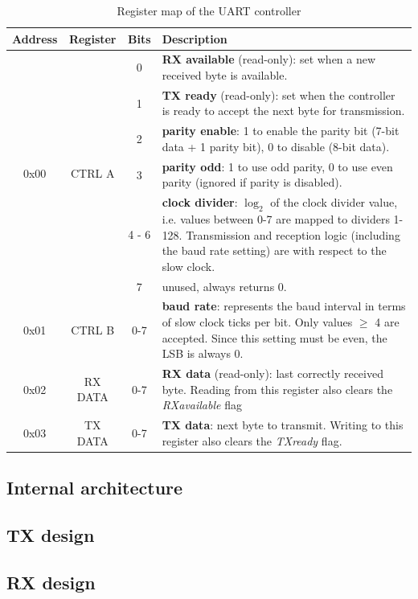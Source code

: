 \documentclass[12pt,a4paper]{article}
\begin{document}
\begin{table}[h]
	\centering
	\begin{tabularx}{\linewidth}{|c|c|c|X|}
		\hline
		Address & Register & Bits & Description \\
		\hline
		\hline
		\multirow{6}{*}{0x00} & \multirow{6}{*}{CTRL A} & 0 & \textbf{RX available} (read-only): set when a new received byte is available. \\
		 & & 1 & \textbf{TX ready} (read-only): set when the controller is ready to accept the next byte for transmission. \\
		 & & 2 & \textbf{parity enable}: 1 to enable the parity bit (7-bit data + 1 parity bit), 0 to disable (8-bit data). \\
		 & & 3 & \textbf{parity odd}: 1 to use odd parity, 0 to use even parity (ignored if parity is disabled). \\
		 & & 4 - 6 & \textbf{clock divider}: $\log_2$ of the clock divider value, i.e. values between 0-7 are mapped to dividers 1-128. Transmission and reception logic (including the baud rate setting) are with respect to the slow clock. \\
		 & & 7 & unused, always returns 0. \\
		 \hline
		 0x01 & CTRL B & 0-7 & \textbf{baud rate}: represents the baud interval in terms of slow clock ticks per bit. Only values $\geq$ 4 are accepted. Since this setting must be even, the LSB is always 0. \\
		 \hline
		 0x02 & RX DATA & 0-7 & \textbf{RX data} (read-only): last correctly received byte. Reading from this register also clears the \textit{RXavailable} flag \\
		 \hline
		 0x03 & TX DATA & 0-7 & \textbf{TX data}: next byte to transmit. Writing to this register also clears the \textit{TXready} flag.\\
		 \hline
	\end{tabularx}
	\caption{Register map of the UART controller}
	\label{tab:map}
\end{table}

\subsection{Internal architecture}

\subsection{TX design}

\subsection{RX design}
\end{document}

